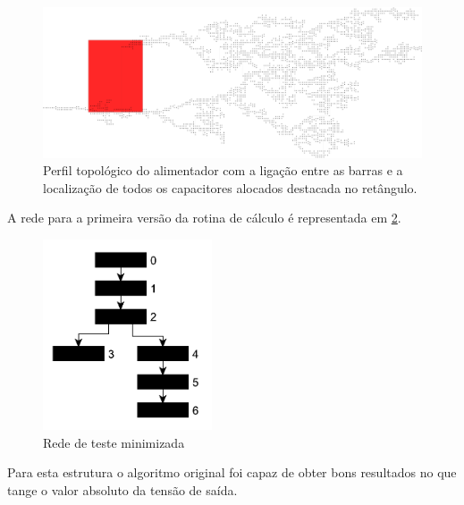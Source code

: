 \documentclass{IEEEtran}
\begin{document}
\begin{figure}
\centering
\includegraphics[width=155mm]{axxxx-05.pdf}
\caption{Perfil topológico do alimentador com a ligação entre as barras e a localização de todos os capacitores alocados destacada no retângulo.}
\label{top}
\end{figure}

A rede para a primeira versão da rotina de cálculo é representada em \ref{top_moc}.

\begin{figure}
	\centering
	\includegraphics[width=50mm]{rede_moc.pdf}
	\caption{Rede de teste minimizada}
	\label{top_moc}
\end{figure}

Para esta estrutura o algoritmo original foi capaz de obter bons resultados no que tange o valor absoluto da tensão de saída.
\end{document}
